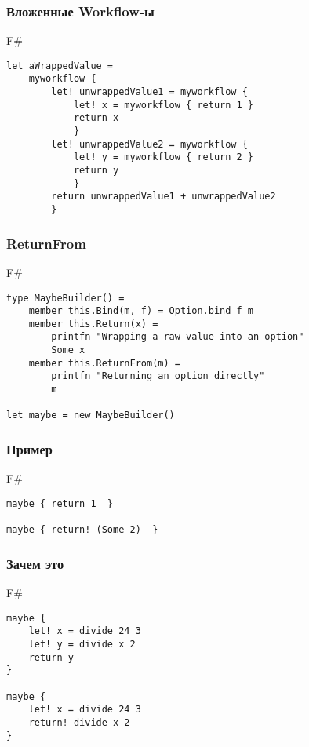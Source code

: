 \documentclass[xetex,mathserif,serif]{beamer}
\begin{document}
	\begin{frame}[fragile]
		\frametitle{Вложенные Workflow-ы}
   		\begin{exampleblock}{F\#}
   			\begin{lstlisting}
let aWrappedValue = 
    myworkflow {
        let! unwrappedValue1 = myworkflow {
            let! x = myworkflow { return 1 }
            return x
            }
        let! unwrappedValue2 = myworkflow {
            let! y = myworkflow { return 2 }
            return y
            }
        return unwrappedValue1 + unwrappedValue2
        }
\end{lstlisting}
\end{exampleblock}
\end{frame}

	\begin{frame}[fragile]
		\frametitle{ReturnFrom}
   		\begin{exampleblock}{F\#}
   			\begin{lstlisting}
type MaybeBuilder() =
    member this.Bind(m, f) = Option.bind f m
    member this.Return(x) = 
        printfn "Wrapping a raw value into an option"
        Some x
    member this.ReturnFrom(m) = 
        printfn "Returning an option directly"
        m

let maybe = new MaybeBuilder()
\end{lstlisting}
\end{exampleblock}
\end{frame}

	\begin{frame}[fragile]
		\frametitle{Пример}
   		\begin{exampleblock}{F\#}
   			\begin{lstlisting}
maybe { return 1  }

maybe { return! (Some 2)  }
\end{lstlisting}
\end{exampleblock}
\end{frame}

	\begin{frame}[fragile]
		\frametitle{Зачем это}
   		\begin{exampleblock}{F\#}
   			\begin{lstlisting}
maybe {
    let! x = divide 24 3
    let! y = divide x 2
    return y 
}    

maybe {
    let! x = divide 24 3
    return! divide x 2  
}
\end{lstlisting}
\end{exampleblock}
\end{frame}
\end{document}
